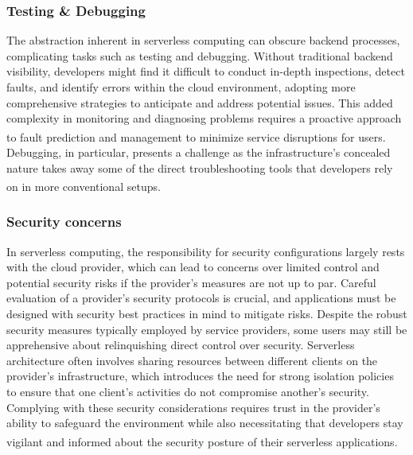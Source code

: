 \subsubsection{Testing \& Debugging}
The abstraction inherent in serverless computing can obscure backend processes, complicating tasks
such as testing and debugging. Without traditional backend visibility, developers might find it
difficult to conduct in-depth inspections, detect faults, and identify errors within the cloud
environment, adopting more comprehensive strategies to anticipate and address potential issues. This
added complexity in monitoring and diagnosing problems requires a proactive approach to fault
prediction and management to minimize service disruptions for
users\textsuperscript{\cite{serverless_3}}. Debugging, in particular, presents a challenge as the
infrastructure's concealed nature takes away some of the direct troubleshooting tools that
developers rely on in more conventional setups\textsuperscript{\cite{serverless_4}}.

\subsubsection{Security concerns}
In serverless computing, the responsibility for security configurations largely rests with the cloud
provider, which can lead to concerns over limited control and potential security risks if the
provider's measures are not up to par. Careful evaluation of a provider's security protocols is
crucial, and applications must be designed with security best practices in mind to mitigate risks.
Despite the robust security measures typically employed by service providers, some users may still
be apprehensive about relinquishing direct control over security. Serverless architecture often
involves sharing resources between different clients on the provider's infrastructure, which
introduces the need for strong isolation policies to ensure that one client's activities do not
compromise another's security. Complying with these security considerations requires trust in the
provider's ability to safeguard the environment while also necessitating that developers stay
vigilant and informed about the security posture of their serverless
applications\textsuperscript{\cite{serverless_3}}\textsuperscript{\cite{serverless_4}}.


